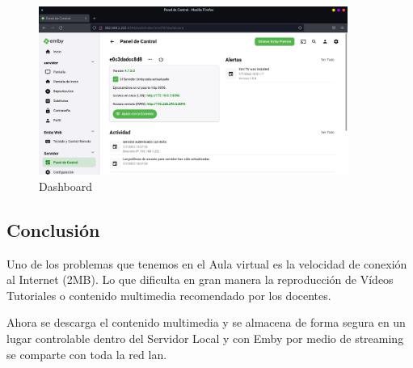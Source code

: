 				\begin{figure}[h]
					
					\centering
					
					\includegraphics[width=0.9\textwidth]{imagenes/docker/emby/emby-dashboard.png}
					
					\caption{Dashboard}
					
					\label{fig:dashboard}
					
				\end{figure}
					
		\subsection{Conclusión}
		
			Uno de los problemas que tenemos en el Aula virtual es la velocidad de conexión al Internet (2MB). Lo que dificulta en gran manera la reproducción de Vídeos Tutoriales o contenido multimedia recomendado por los docentes.\par
			
			Ahora se descarga el contenido multimedia y se almacena de forma segura en un lugar controlable dentro del Servidor Local y con Emby por medio de streaming se comparte con toda la red lan.\par
	